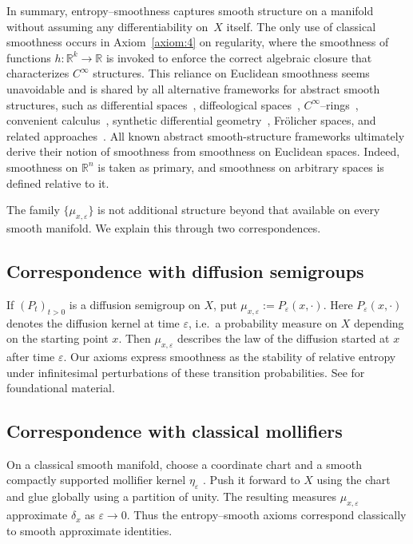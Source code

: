 \documentclass[11pt]{amsart}
\theoremstyle{definition}
\theoremstyle{remark}
\begin{document}
In summary, entropy--smoothness captures smooth structure on a manifold
without assuming any differentiability on~$X$ itself.  The only use of
classical smoothness occurs in Axiom~\ref{axiom:4} on regularity, where the
smoothness of functions $h:\mathbb{R}^k\to\mathbb{R}$ is invoked to
enforce the correct algebraic closure that characterizes $C^\infty$
structures. This reliance on Euclidean smoothness seems unavoidable and is shared by all alternative frameworks for abstract smooth structures, such as differential
spaces~\cite{sikorski1967differential}, diffeological spaces~\cite{IglesiasZemmour13,Souriau80},
$C^\infty$--rings~\cite{moerdijk2003models,Kock06,JoyceCinfRings},
convenient calculus~\cite{KrieglMichor97},
synthetic differential geometry~\cite{Kock06},
Fr{\"o}licher spaces,
and related approaches~\cite{Nestruev03}. All known abstract smooth-structure frameworks ultimately derive their notion of smoothness from smoothness on Euclidean spaces. Indeed, smoothness on $\mathbb{R}^n$ is taken as primary, and smoothness on arbitrary spaces is defined relative to it.

The family $\{\mu_{x,\varepsilon}\}$ is not additional structure beyond that available on every smooth manifold. We explain this through two correspondences.

\subsection{Correspondence with diffusion semigroups}
If $(P_t)_{t>0}$ is a diffusion semigroup on $X$, put $\mu_{x,\varepsilon} := P_\varepsilon(x,\cdot)$. Here $P_\varepsilon(x,\cdot)$ denotes the diffusion kernel at time $\varepsilon$, i.e.~a probability measure on $X$ depending on the starting point $x$. Then $\mu_{x,\varepsilon}$ describes the law of the diffusion started at $x$ after time $\varepsilon$. Our axioms express smoothness as the stability of relative entropy under infinitesimal perturbations of these transition probabilities. See \cite{bakry2014analysis} for foundational material.


\subsection{Correspondence with classical mollifiers}
On a classical smooth manifold, choose a coordinate chart and a smooth compactly supported mollifier kernel $\eta_\varepsilon$ \cite{lee2013smooth}. Push it forward to $X$ using the chart and glue globally using a partition of unity. The resulting measures $\mu_{x,\varepsilon}$ approximate $\delta_x$ as $\varepsilon\to 0$. Thus the entropy--smooth axioms correspond classically to smooth approximate identities.
\end{document}
